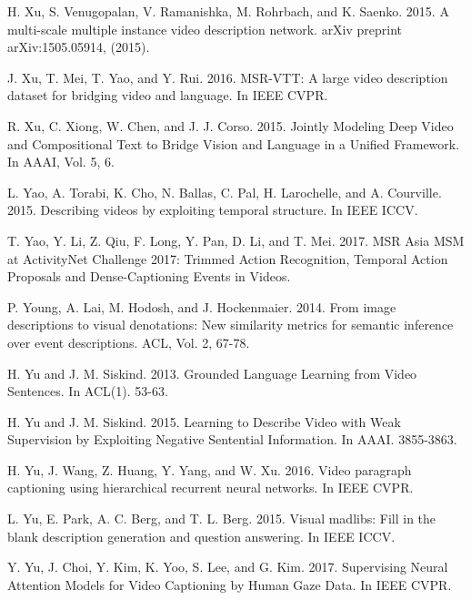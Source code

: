 \documentclass[10pt,journal,compsoc]{IEEEtran}
\begin{document}
\begin{thebibliography}{1}
H. Xu, S. Venugopalan, V. Ramanishka, M. Rohrbach, and K. Saenko. 2015. A multi-scale multiple instance video description network. arXiv preprint arXiv:1505.05914, (2015).

J. Xu, T. Mei, T. Yao, and Y. Rui. 2016. MSR-VTT: A large video description dataset for bridging video and language. In IEEE CVPR.

R. Xu, C. Xiong, W. Chen, and J. J. Corso. 2015. Jointly Modeling Deep Video and Compositional Text to Bridge Vision and Language in a Unified Framework. In AAAI, Vol. 5, 6.

L. Yao, A. Torabi, K. Cho, N. Ballas, C. Pal, H. Larochelle, and A. Courville. 2015. Describing videos by exploiting temporal structure. In IEEE ICCV.


T. Yao, Y. Li, Z. Qiu, F. Long, Y. Pan, D. Li, and T. Mei. 2017. MSR Asia MSM at ActivityNet Challenge 2017: Trimmed Action Recognition, Temporal Action Proposals and Dense-Captioning Events in Videos.

P. Young, A. Lai, M. Hodosh, and J. Hockenmaier. 2014. From image descriptions to visual denotations: New similarity metrics for semantic inference over event descriptions. ACL, Vol. 2, 67-78.

H. Yu and J. M. Siskind. 2013. Grounded Language Learning from Video Sentences. In ACL(1). 53-63.

H. Yu and J. M. Siskind. 2015. Learning to Describe Video with Weak Supervision by Exploiting Negative Sentential Information. In AAAI. 3855-3863.

H. Yu, J. Wang, Z. Huang, Y. Yang, and W. Xu. 2016. Video paragraph captioning using hierarchical recurrent neural networks. In IEEE CVPR.

L. Yu, E. Park, A. C. Berg, and T. L. Berg. 2015. Visual madlibs: Fill in the blank description generation and question answering. In IEEE ICCV.

Y. Yu, J. Choi, Y. Kim, K. Yoo, S. Lee, and G. Kim. 2017. Supervising Neural Attention Models for Video Captioning by Human Gaze Data. In IEEE CVPR.


\end{thebibliography}
\end{document}
